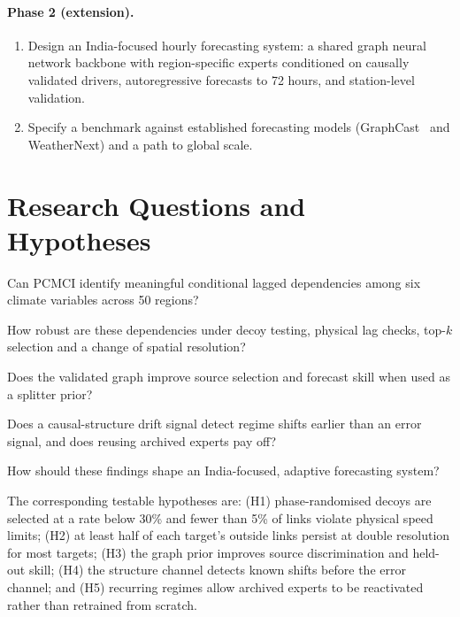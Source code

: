 \paragraph{Phase 2 (extension).}
\begin{enumerate}[label=\textbf{O\arabic*.}, resume]
  \item Design an India-focused hourly forecasting system: a shared graph neural network backbone with region-specific experts conditioned on causally validated drivers, autoregressive forecasts to 72 hours, and station-level validation.
  \item Specify a benchmark against established forecasting models (GraphCast~\cite{lam2023learning} and WeatherNext) and a path to global scale.
\end{enumerate}

\section{Research Questions and Hypotheses}
\label{sec:intro-rq}

\begin{description}[style=nextline,leftmargin=1.1cm]
  \item[RQ1] Can PCMCI identify meaningful conditional lagged dependencies among six climate variables across 50 regions?
  \item[RQ2] How robust are these dependencies under decoy testing, physical lag checks, top-$k$ selection and a change of spatial resolution?
  \item[RQ3] Does the validated graph improve source selection and forecast skill when used as a splitter prior?
  \item[RQ4] Does a causal-structure drift signal detect regime shifts earlier than an error signal, and does reusing archived experts pay off?
  \item[RQ5] How should these findings shape an India-focused, adaptive forecasting system?
\end{description}

The corresponding testable hypotheses are: (H1) phase-randomised decoys are selected at a rate below 30\% and fewer than 5\% of links violate physical speed limits; (H2) at least half of each target's outside links persist at double resolution for most targets; (H3) the graph prior improves source discrimination and held-out skill; (H4) the structure channel detects known shifts before the error channel; and (H5) recurring regimes allow archived experts to be reactivated rather than retrained from scratch.

